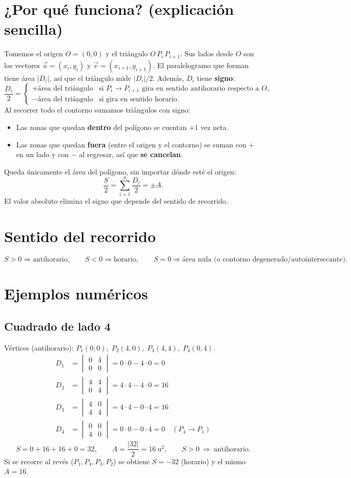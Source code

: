 ﻿\documentclass[11pt,a4paper]{article}
\newcommand{\deter}[4]{\begin{vmatrix} #1 & #2 \\ #3 & #4 \end{vmatrix}}
\begin{document}
\section{¿Por qu\'e funciona? (explicaci\'on sencilla)}
Tomemos el origen $O=(0,0)$ y el tri\'angulo $O\,P_i\,P_{i+1}$. Sus lados desde $O$
son los vectores $\vec{u}=(x_i,y_i)$ y $\vec{v}=(x_{i+1},y_{i+1})$. El
paralelogramo que forman tiene \'area $|D_i|$, as\'i que el tri\'angulo mide
$|D_i|/2$. Adem\'as, $D_i$ tiene \textbf{signo}:
\[
\frac{D_i}{2}=
\begin{cases}
+\text{\'area del tri\'angulo} & \text{si } P_i\to P_{i+1} \text{ gira en sentido antihorario respecto a } O,\\[2pt]
-\text{\'area del tri\'angulo} & \text{si gira en sentido horario}.
\end{cases}
\]
Al recorrer todo el contorno sumamos tri\'angulos con signo:
\begin{itemize}
  \item Las zonas que quedan \textbf{dentro} del pol\'igono se cuentan $+1$ vez neta.
  \item Las zonas que quedan \textbf{fuera} (entre el origen y el contorno) se suman
        con $+$ en un lado y con $-$ al regresar, as\'i que \textbf{se cancelan}.
\end{itemize}
Queda \'unicamente el \'area del pol\'igono, sin importar d\'onde est\'e el origen:
\[
\frac{S}{2}=\sum_{i=1}^{n}\frac{D_i}{2}=\pm A .
\]
El valor absoluto elimina el signo que depende del sentido de recorrido.

\section{Sentido del recorrido}
\[
S>0\Rightarrow \text{antihorario},\qquad
S<0\Rightarrow \text{horario},\qquad
S=0\Rightarrow \text{\'area nula (o contorno degenerado/autointersecante)}.
\]

\section{Ejemplos num\'ericos}

\subsection{Cuadrado de lado 4}
V\'ertices (antihorario): $P_1(0,0),\;P_2(4,0),\;P_3(4,4),\;P_4(0,4)$.
\begin{align*}
D_1&=\deter{0}{4}{0}{0}=0\cdot0-4\cdot0=0\\
D_2&=\deter{4}{4}{0}{4}=4\cdot4-4\cdot0=16\\
D_3&=\deter{4}{0}{4}{4}=4\cdot4-0\cdot4=16\\
D_4&=\deter{0}{0}{4}{0}=0\cdot0-0\cdot4=0\quad(P_4\to P_1)
\end{align*}
\[
S=0+16+16+0=32,\qquad A=\frac{|32|}{2}=\boxed{16}\ \text{u}^2,\qquad S>0\ \Rightarrow\ \text{antihorario}.
\]
Si se recorre al rev\'es ($P_1,P_4,P_3,P_2$) se obtiene $S=-32$ (horario) y el mismo
$A=16$.
\end{document}
